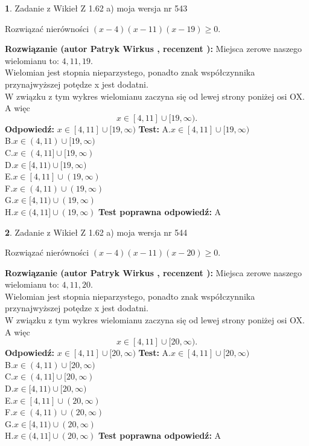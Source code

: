 \documentclass[12pt, a4paper]{article}
\theoremstyle{definition} %
\newtheorem{zad}{}
\newcommand{\zadStart}[1]{\begin{zad}#1\newline}
\newcommand{\zadStop}{\end{zad}}
\newcommand{\rozwStart}[2]{\noindent \textbf{Rozwiązanie (autor #1 , recenzent #2): }\newline}
\newcommand{\rozwStop}{\newline}
\newcommand{\odpStart}{\noindent \textbf{Odpowiedź:}\newline}
\newcommand{\odpStop}{\newline}
\newcommand{\testStart}{\noindent \textbf{Test:}\newline}
\newcommand{\testStop}{\newline}
\newcommand{\kluczStart}{\noindent \textbf{Test poprawna odpowiedź:}\newline}
\newcommand{\kluczStop}{\newline}
\begin{document}
\zadStart{Zadanie z Wikieł Z 1.62 a) moja wersja nr 543}

Rozwiązać nierówności $(x-4)(x-11)(x-19)\ge0$.
\zadStop
\rozwStart{Patryk Wirkus}{}
Miejsca zerowe naszego wielomianu to: $4, 11, 19$.\\
Wielomian jest stopnia nieparzystego, ponadto znak współczynnika przy\linebreak najwyższej potędze x jest dodatni.\\ W związku z tym wykres wielomianu zaczyna się od lewej strony poniżej osi OX. A więc $$x \in [4,11] \cup [19,\infty).$$
\rozwStop
\odpStart
$x \in [4,11] \cup [19,\infty)$
\odpStop
\testStart
A.$x \in [4,11] \cup [19,\infty)$\\
B.$x \in (4,11) \cup [19,\infty)$\\
C.$x \in (4,11] \cup [19,\infty)$\\
D.$x \in [4,11) \cup [19,\infty)$\\
E.$x \in [4,11] \cup (19,\infty)$\\
F.$x \in (4,11) \cup (19,\infty)$\\
G.$x \in [4,11) \cup (19,\infty)$\\
H.$x \in (4,11] \cup (19,\infty)$
\testStop
\kluczStart
A
\kluczStop



\zadStart{Zadanie z Wikieł Z 1.62 a) moja wersja nr 544}

Rozwiązać nierówności $(x-4)(x-11)(x-20)\ge0$.
\zadStop
\rozwStart{Patryk Wirkus}{}
Miejsca zerowe naszego wielomianu to: $4, 11, 20$.\\
Wielomian jest stopnia nieparzystego, ponadto znak współczynnika przy\linebreak najwyższej potędze x jest dodatni.\\ W związku z tym wykres wielomianu zaczyna się od lewej strony poniżej osi OX. A więc $$x \in [4,11] \cup [20,\infty).$$
\rozwStop
\odpStart
$x \in [4,11] \cup [20,\infty)$
\odpStop
\testStart
A.$x \in [4,11] \cup [20,\infty)$\\
B.$x \in (4,11) \cup [20,\infty)$\\
C.$x \in (4,11] \cup [20,\infty)$\\
D.$x \in [4,11) \cup [20,\infty)$\\
E.$x \in [4,11] \cup (20,\infty)$\\
F.$x \in (4,11) \cup (20,\infty)$\\
G.$x \in [4,11) \cup (20,\infty)$\\
H.$x \in (4,11] \cup (20,\infty)$
\testStop
\kluczStart
A
\kluczStop
\end{document}
